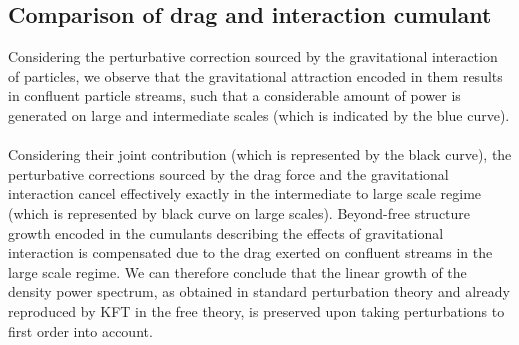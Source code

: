 \subsection{Comparison of drag and interaction cumulant}
Considering the perturbative correction sourced by the gravitational interaction of particles, we observe
that the gravitational attraction encoded in them results in
confluent particle streams, such that a considerable amount of power is generated on large and
intermediate scales (which is indicated by the blue curve).\\
\\
Considering their joint contribution (which is represented by the black curve), the perturbative corrections sourced by the drag force and the gravitational interaction cancel effectively exactly in the intermediate to large scale regime (which is represented by black curve on large scales).
Beyond-free structure growth encoded in the cumulants describing the effects of gravitational interaction is compensated due to the drag exerted on confluent streams in the large scale regime. 
We can therefore conclude that the linear growth of the density power spectrum, as obtained in standard perturbation theory and already reproduced by KFT in the free theory, is preserved upon taking perturbations to first order into account.
